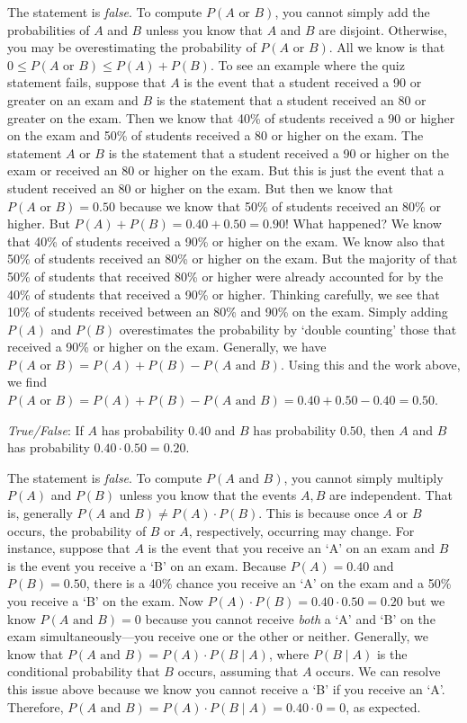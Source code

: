 \documentclass[11pt,letterpaper]{article}
\begin{document}
\sol The statement is \textit{false}. To compute $P(A \text{ or }B)$, you cannot simply add the probabilities of $A$ and $B$ unless you know that $A$ and $B$ are disjoint. Otherwise, you may be overestimating the probability of $P(A \text{ or }B)$. All we know is that $0 \leq P(A \text{ or }B) \leq P(A) + P(B)$. To see an example where the quiz statement fails, suppose that $A$ is the event that a student received a 90 or greater on an exam and $B$ is the statement that a student received an 80 or greater on the exam. Then we know that 40\% of students received a 90 or higher on the exam and 50\% of students received a 80 or higher on the exam. The statement $A \text{ or } B$ is the statement that a student received a 90 or higher on the exam or received an 80 or higher on the exam. But this is just the event that a student received an 80 or higher on the exam. But then we know that $P(A \text{ or } B)= 0.50$ because we know that 50\% of students received an 80\% or higher. But $P(A) + P(B)= 0.40 + 0.50= 0.90$! What happened? We know that 40\% of students received a 90\% or higher on the exam. We know also that 50\% of students received an 80\% or higher on the exam. But the majority of that 50\% of students that received 80\% or higher were already accounted for by the 40\% of students that received a 90\% or higher. Thinking carefully, we see that 10\% of students received between an 80\% and 90\% on the exam. Simply adding $P(A)$ and $P(B)$ overestimates the probability by `double counting' those that received a 90\% or higher on the exam. Generally, we have $P(A \text{ or }B)= P(A) + P(B) - P(A \text{ and } B)$. Using this and the work above, we find $P(A \text{ or } B)= P(A) + P(B) - P(A \text{ and } B)= 0.40 + 0.50 - 0.40= 0.50$. \pvspace{1.3cm}



\quizsol \textit{True/False}: If $A$ has probability $0.40$ and $B$ has probability $0.50$, then $A$ and $B$ has probability $0.40 \cdot 0.50= 0.20$. \pspace

\sol The statement is \textit{false}. To compute $P(A \text{ and } B)$, you cannot simply multiply $P(A)$ and $P(B)$ unless you know that the events $A, B$ are independent. That is, generally $P(A \text{ and } B) \neq P(A) \cdot P(B)$. This is because once $A$ or $B$ occurs, the probability of $B$ or $A$, respectively, occurring may change. For instance, suppose that $A$ is the event that you receive an `A' on an exam and $B$ is the event you receive a `B' on an exam. Because $P(A)= 0.40$ and $P(B)= 0.50$, there is a 40\% chance you receive an `A' on the exam and a 50\% you receive a `B' on the exam. Now $P(A) \cdot P(B)= 0.40 \cdot 0.50= 0.20$ but we know $P(A \text{ and } B)= 0$ because you cannot receive \textit{both} a `A' and `B' on the exam simultaneously---you receive one or the other or neither. Generally, we know that $P(A \text{ and } B)= P(A) \cdot P(B \;|\; A)$, where $P(B \;|\; A)$ is the conditional probability that $B$ occurs, assuming that $A$ occurs. We can resolve this issue above because we know you cannot receive a `B' if you receive an `A'. Therefore, $P(A \text{ and } B)= P(A) \cdot P(B \;|\; A)= 0.40 \cdot 0= 0$, as expected. \pvspace{1.3cm}
\end{document}
